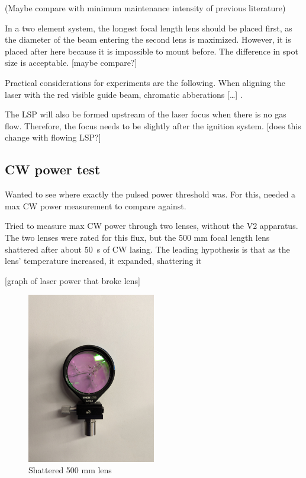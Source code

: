                 (Maybe compare with minimum maintenance intensity of previous literature)

                In a two element system, the longest focal length lens should be placed first, as the diameter of the beam entering the second lens is maximized. However, it is placed after here because it is impossible to mount before. The difference in spot size is acceptable. [maybe compare?]

                Practical considerations for experiments are the following. When aligning the laser with the red visible guide beam, chromatic abberations [\dots] \cite{hechtUnderstandingLasersEntry2019}.

                The LSP will also be formed upstream of the laser focus when there is no gas flow. Therefore, the focus needs to be slightly after the ignition system. [does this change with flowing LSP?]

                \subsection{CW power test}

                Wanted to see where exactly the pulsed power threshold was. For this, needed a max CW power measurement to compare against. 
    
                Tried to measure max CW power through two lenses, without the V2 apparatus. The two lenses were rated for this flux, but the 500 mm focal length lens shattered after about \qty{50}{s} of CW lasing. The leading hypothesis is that as the lens' temperature increased, it expanded, shattering it
    
                [graph of laser power that broke lens]
    
                \begin{figure}[!ht]
                    \centering
                    \includegraphics[width=0.5\textwidth]{assets/4 experiments/Shattered 500 mm lens.jpg}
                    \caption{Shattered 500 mm lens}
                \end{figure}
    
